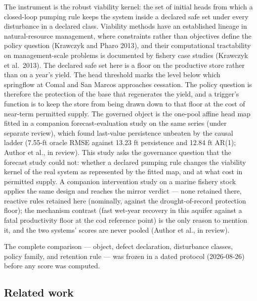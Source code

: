 \documentclass[11pt]{article}
\begin{document}
The instrument is the robust viability kernel: the set of initial heads
from which a closed-loop pumping rule keeps the system inside a declared
safe set under every disturbance in a declared class. Viability methods
have an established lineage in natural-resource management, where
constraints rather than objectives define the policy question (Krawczyk
and Pharo 2013), and their computational tractability on
management-scale problems is documented by fishery case studies
(Krawczyk et al.~2013). The declared safe set here is a floor on the
productive store rather than on a year's yield. The head threshold marks
the level below which springflow at Comal and San Marcos approaches
cessation. The policy question is therefore the protection of the base
that regenerates the yield, and a trigger's function is to keep the
store from being drawn down to that floor at the cost of near-term
permitted supply. The governed object is the one-pool affine head map
fitted in a companion forecast-evaluation study on the same series
(under separate review), which found last-value persistence unbeaten by
the causal ladder (7.55-ft oracle RMSE against 13.23 ft persistence and
12.84 ft AR(1); Author et al., in review). This study asks the
governance question that the forecast study could not: whether a
declared pumping rule changes the viability kernel of the real system as
represented by the fitted map, and at what cost in permitted supply. A
companion intervention study on a marine fishery stock applies the same
design and reaches the mirror verdict --- none retained there, reactive
rules retained here (nominally, against the drought-of-record protection floor); the
mechanism contrast (fast wet-year recovery in this aquifer against a
fatal productivity floor at the cod reference point) is the only reason
to mention it, and the two systems' scores are never pooled (Author et
al., in review).

The complete comparison --- object, defect declaration, disturbance
classes, policy family, and retention rule --- was frozen in a dated
protocol (2026-08-26) before any score was computed.

\subsection{Related work}
\label{edw-priorart}
\end{document}
